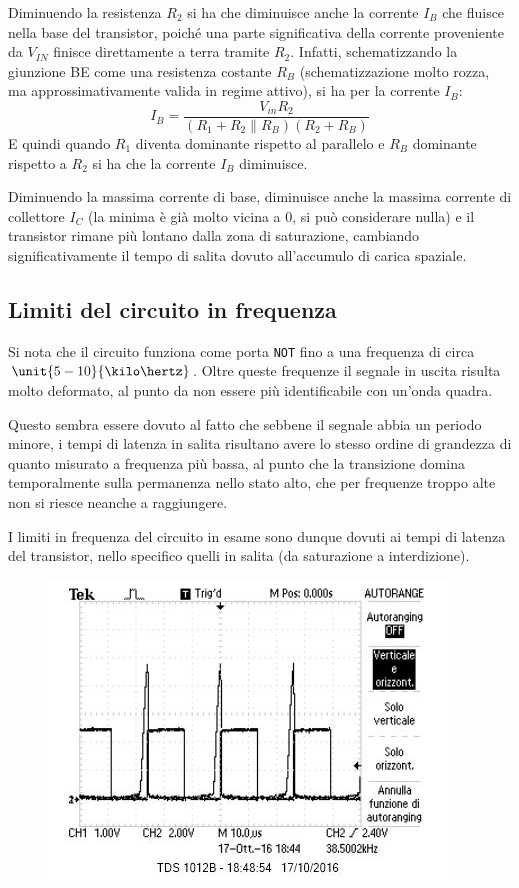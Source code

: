 \documentclass[10pt,a4paper]{article}
\def\code#1{\texttt{#1}}
\begin{document}
Diminuendo la resistenza $R_2$ si ha che diminuisce anche la corrente $I_B$ che fluisce nella base del transistor, poiché una parte significativa della corrente proveniente da $V_{IN}$ finisce direttamente a terra tramite $R_2$. Infatti, schematizzando la giunzione BE come una resistenza costante $R_B$ (schematizzazione molto rozza, ma approssimativamente valida in regime attivo), si ha per la corrente $I_B$:
\begin{equation*}
I_B = \frac{V_{in} R_2}{(R_1 + R_2\parallel R_B)(R_2 + R_B)}
\end{equation*}
E quindi quando $R_1$ diventa dominante rispetto al parallelo e $R_B$ dominante rispetto a $R_2$ si ha che la corrente $I_B$ diminuisce.

Diminuendo la massima corrente di base, diminuisce anche la massima corrente di collettore $I_C$ (la minima è già molto vicina a 0, si può considerare nulla) e il transistor rimane più lontano dalla zona di saturazione, cambiando significativamente il tempo di salita dovuto all'accumulo di carica spaziale.

\subsection{Limiti del circuito in frequenza}
Si nota che il circuito funziona come porta \code{NOT} fino a una frequenza di circa $\unit{5-10}{\kilo\hertz}$. Oltre queste frequenze il segnale in uscita risulta molto deformato, al punto da non essere più identificabile con un'onda quadra.

Questo sembra essere dovuto al fatto che sebbene il segnale abbia un periodo minore, i tempi di latenza in salita risultano avere lo stesso ordine di grandezza di quanto misurato a frequenza più bassa, al punto che la transizione domina temporalmente sulla permanenza nello stato alto, che per frequenze troppo alte non si riesce neanche a raggiungere.

I limiti in frequenza del circuito in esame sono dunque dovuti ai tempi di latenza del transistor, nello specifico quelli in salita (da saturazione a interdizione).

\begin{figure}[h!]
\centering
\includegraphics{../oscilloscopio/raise_problem.jpg}
\caption{}
\end{figure}
\end{document}
